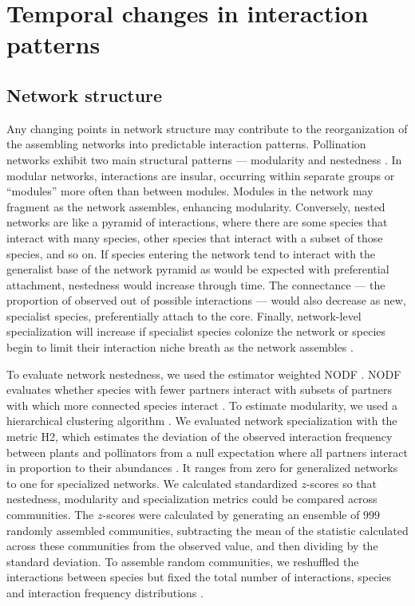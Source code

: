\documentclass[12pt]{article}
\begin{document}
\section*{Temporal changes in interaction patterns}

\subsection*{Network structure}
Any changing points in network structure may contribute to the
reorganization of the assembling networks into predictable interaction
patterns. Pollination networks exhibit two main structural patterns
--- modularity \citep[e.g.,][]{Olesen2007} and nestedness
\citep[e.g.,][]{Bascompte2006, Bascompte2003}. In modular networks,
interactions are insular, occurring within separate groups or
``modules'' more often than between modules. Modules in the network
may fragment as the network assembles, enhancing
modularity. Conversely, nested networks are like a pyramid of
interactions, where there are some species that interact with many
species, other species that interact with a subset of those species,
and so on. If species entering the network tend to interact with the
generalist base of the network pyramid as would be expected with
preferential attachment, nestedness would increase through time. The
connectance --- the proportion of observed out of possible
interactions --- would also decrease as new, specialist species,
preferentially attach to the core. Finally, network-level
specialization will increase if specialist species colonize the
network or species begin to limit their interaction niche breath as
the network assembles \citep{bluthgen-2006-9}.

To evaluate network nestedness, we used the estimator weighted NODF
\citep{almeida-neto-2008-1227}. NODF evaluates whether species with
fewer partners interact with subsets of partners with which more
connected species interact \citep{almeida-neto-2008-1227}. To estimate
modularity, we used a hierarchical clustering algorithm
\citep{Newman2004, csardi-2006}. We evaluated network specialization
with the metric H2, which estimates the deviation of the observed
interaction frequency between plants and pollinators from a null
expectation where all partners interact in proportion to their
abundances \citep{bluthgen-2006-9}. It ranges from zero for
generalized networks to one for specialized networks.  We calculated
standardized $z$-scores so that nestedness, modularity and
specialization metrics could be compared across communities. The
$z$-scores were calculated by generating an ensemble of $999$ randomly
assembled communities, subtracting the mean of the statistic
calculated across these communities from the observed value, and then
dividing by the standard deviation. To assemble random communities, we
reshuffled the interactions between species but fixed the total number
of interactions, species and interaction frequency distributions
\citep{Galeano2009}.
\end{document}
